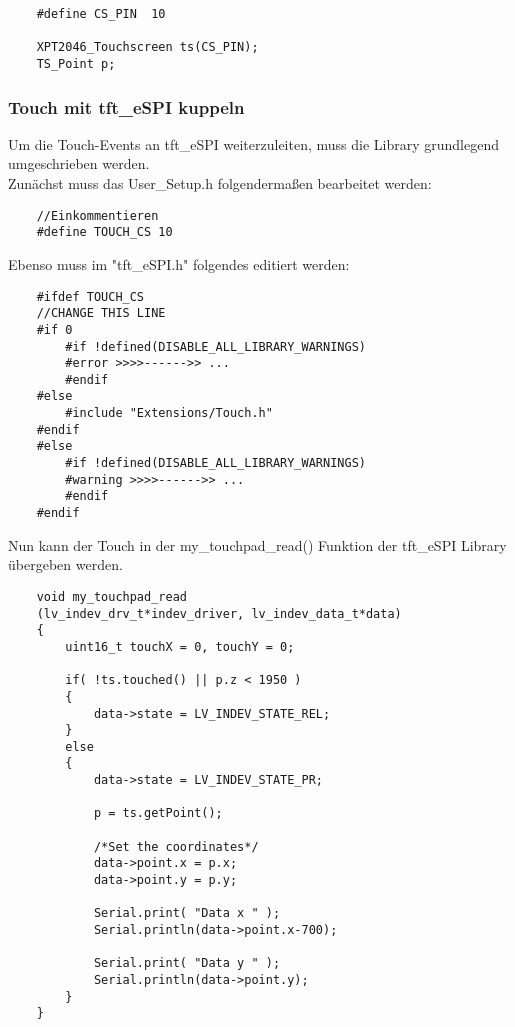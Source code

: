 \begin{lstlisting}
    #define CS_PIN  10

    XPT2046_Touchscreen ts(CS_PIN);
    TS_Point p;
\end{lstlisting}

            \subsubsection{Touch mit tft\_eSPI kuppeln} \label{touch_to_tft}
            Um die Touch-Events an tft\_eSPI weiterzuleiten, muss die Library grundlegend \\ 
            umgeschrieben werden.\\
            Zunächst muss das User\_Setup.h folgendermaßen bearbeitet werden:

\begin{lstlisting}
    //Einkommentieren
    #define TOUCH_CS 10 
\end{lstlisting}

            
            \begin{minipage}{\linewidth}
            Ebenso muss im "tft\_eSPI.h" folgendes editiert werden:
\begin{lstlisting}   
    #ifdef TOUCH_CS
    //CHANGE THIS LINE
    #if 0
        #if !defined(DISABLE_ALL_LIBRARY_WARNINGS)
        #error >>>>------>> ...
        #endif
    #else
        #include "Extensions/Touch.h"
    #endif
    #else
        #if !defined(DISABLE_ALL_LIBRARY_WARNINGS)
        #warning >>>>------>> ...
        #endif
    #endif
\end{lstlisting}\end{minipage}
            
            

            \begin{minipage}{\linewidth}
            Nun kann der Touch in der my\_touchpad\_read() Funktion der tft\_eSPI Library
            übergeben werden.
            \begin{lstlisting}
    void my_touchpad_read
    (lv_indev_drv_t*indev_driver, lv_indev_data_t*data)
    {
        uint16_t touchX = 0, touchY = 0;
    
        if( !ts.touched() || p.z < 1950 )
        {
            data->state = LV_INDEV_STATE_REL;
        }
        else
        {
            data->state = LV_INDEV_STATE_PR;
    
            p = ts.getPoint();

            /*Set the coordinates*/
            data->point.x = p.x;
            data->point.y = p.y;
    
            Serial.print( "Data x " );
            Serial.println(data->point.x-700);
    
            Serial.print( "Data y " );
            Serial.println(data->point.y);
        }
    }
            \end{lstlisting}\end{minipage}

